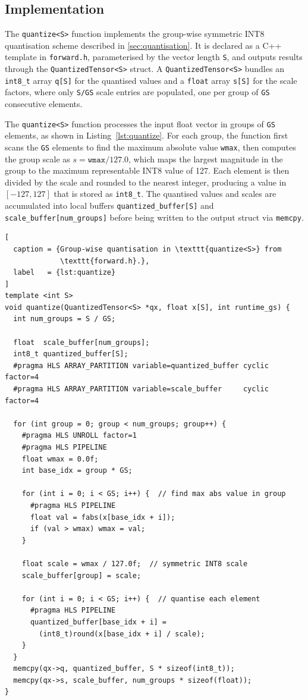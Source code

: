 \subsection{Implementation}
\label{subsec:quantize_impl}

The \texttt{quantize<S>} function implements the group-wise symmetric
INT8 quantisation scheme described in \cref{sec:quantisation}. It is
declared as a C++ template in \texttt{forward.h}, parameterised by the
vector length \texttt{S}, and outputs results through the
\texttt{QuantizedTensor<S>} struct. A \texttt{QuantizedTensor<S>}
bundles an \texttt{int8\_t} array \texttt{q[S]} for the quantised values
and a \texttt{float} array \texttt{s[S]} for the scale factors, where
only \texttt{S/GS} scale entries are populated, one per group of
\texttt{GS} consecutive elements.

The \texttt{quantize<S>} function
processes the input float vector in groups of \texttt{GS} elements, as
shown in Listing~\ref{lst:quantize}. For each group, the function first
scans the \texttt{GS} elements to find the maximum absolute value
\texttt{wmax}, then computes the group scale as $s = \texttt{wmax} /
127.0$, which maps the largest magnitude in the group to the maximum
representable INT8 value of 127. Each element is then divided by the
scale and rounded to the nearest integer, producing a value in
$[-127, 127]$ that is stored as \texttt{int8\_t}. The quantised values
and scales are accumulated into local buffers
\texttt{quantized\_buffer[S]} and \texttt{scale\_buffer[num\_groups]}
before being written to the output struct via \texttt{memcpy}.

\begin{lstlisting}[
  caption = {Group-wise quantisation in \texttt{quantize<S>} from
             \texttt{forward.h}.},
  label   = {lst:quantize}
]
template <int S>
void quantize(QuantizedTensor<S> *qx, float x[S], int runtime_gs) {
  int num_groups = S / GS;

  float  scale_buffer[num_groups];
  int8_t quantized_buffer[S];
  #pragma HLS ARRAY_PARTITION variable=quantized_buffer cyclic factor=4
  #pragma HLS ARRAY_PARTITION variable=scale_buffer     cyclic factor=4

  for (int group = 0; group < num_groups; group++) {
    #pragma HLS UNROLL factor=1
    #pragma HLS PIPELINE
    float wmax = 0.0f;
    int base_idx = group * GS;

    for (int i = 0; i < GS; i++) {  // find max abs value in group
      #pragma HLS PIPELINE
      float val = fabs(x[base_idx + i]);
      if (val > wmax) wmax = val;
    }

    float scale = wmax / 127.0f;  // symmetric INT8 scale
    scale_buffer[group] = scale;

    for (int i = 0; i < GS; i++) {  // quantise each element
      #pragma HLS PIPELINE
      quantized_buffer[base_idx + i] =
        (int8_t)round(x[base_idx + i] / scale);
    }
  }
  memcpy(qx->q, quantized_buffer, S * sizeof(int8_t));
  memcpy(qx->s, scale_buffer, num_groups * sizeof(float));
}
\end{lstlisting}

